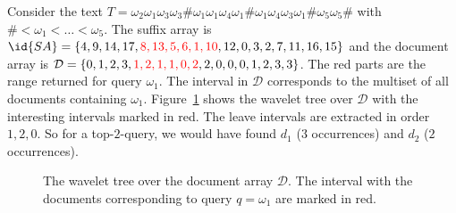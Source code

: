 \begin{Example}
  Consider the text $T = \omega_2\omega_1\omega_3\omega_3\#\omega_1\omega_1\omega_4\omega_1\#\omega_1\omega_4\omega_3\omega_1\#\omega_5\omega_5\#$ with $\# < \omega_1 < \ldots < \omega_5$. The suffix array is $\id{SA} = \{4,9,14,17,{\color{red}8,13,5,6,1,10},12,0,3,2,7,11,16,15\}$ and the document array is $\mathcal{D} = \{0,1,2,3,{\color{red}1,2,1,1,0,2},2,0,0,0,1,2,3,3\}$. The red parts are the range  returned for query $\omega_1$. The interval in $\mathcal{D}$ corresponds to the multiset of all documents containing $\omega_1$. Figure~\ref{fig:greedyWaveletTree} shows the wavelet tree over $\mathcal{D}$ with the interesting intervals marked in red. The leave intervals are extracted in order $1,2,0$. So for a top-$2$-query, we would have found $d_1$ ($3$ occurrences) and $d_2$ ($2$ occurrences).

  \begin{figure}[htb]
    \centering
    
    \caption{The wavelet tree over the document array $\mathcal{D}$. The interval with the documents corresponding to query $q = \omega_1$ are marked in red.}
    \label{fig:greedyWaveletTree}
  \end{figure}
\end{Example}
